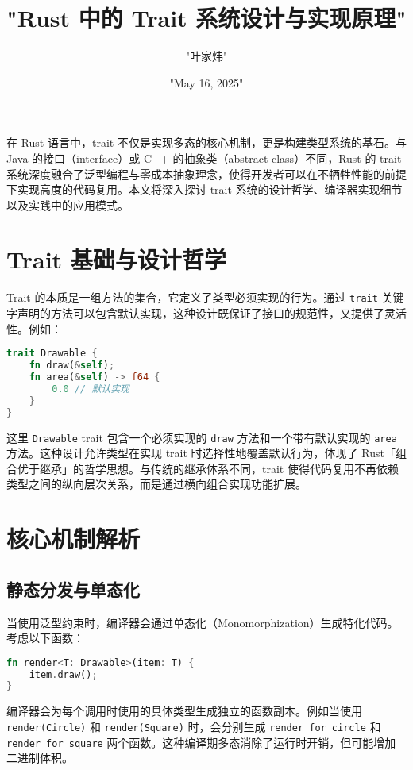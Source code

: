 \title{"Rust 中的 Trait 系统设计与实现原理"}
\author{"叶家炜"}
\date{"May 16, 2025"}
\maketitle
在 Rust 语言中，trait 不仅是实现多态的核心机制，更是构建类型系统的基石。与 Java 的接口（interface）或 C++ 的抽象类（abstract class）不同，Rust 的 trait 系统深度融合了泛型编程与零成本抽象理念，使得开发者可以在不牺牲性能的前提下实现高度的代码复用。本文将深入探讨 trait 系统的设计哲学、编译器实现细节以及实践中的应用模式。\par
\chapter{Trait 基础与设计哲学}
Trait 的本质是一组方法的集合，它定义了类型必须实现的行为。通过 \verb!trait! 关键字声明的方法可以包含默认实现，这种设计既保证了接口的规范性，又提供了灵活性。例如：\par
\begin{lstlisting}[language=rust]
trait Drawable {
    fn draw(&self);
    fn area(&self) -> f64 {
        0.0 // 默认实现
    }
}
\end{lstlisting}
这里 \verb!Drawable! trait 包含一个必须实现的 \verb!draw! 方法和一个带有默认实现的 \verb!area! 方法。这种设计允许类型在实现 trait 时选择性地覆盖默认行为，体现了 Rust「组合优于继承」的哲学思想。与传统的继承体系不同，trait 使得代码复用不再依赖类型之间的纵向层次关系，而是通过横向组合实现功能扩展。\par
\chapter{核心机制解析}
\section{静态分发与单态化}
当使用泛型约束时，编译器会通过单态化（Monomorphization）生成特化代码。考虑以下函数：\par
\begin{lstlisting}[language=rust]
fn render<T: Drawable>(item: T) {
    item.draw();
}
\end{lstlisting}
编译器会为每个调用时使用的具体类型生成独立的函数副本。例如当使用 \verb!render(Circle)! 和 \verb!render(Square)! 时，会分别生成 \verb!render_for_circle! 和 \verb!render_for_square! 两个函数。这种编译期多态消除了运行时开销，但可能增加二进制体积。\par
